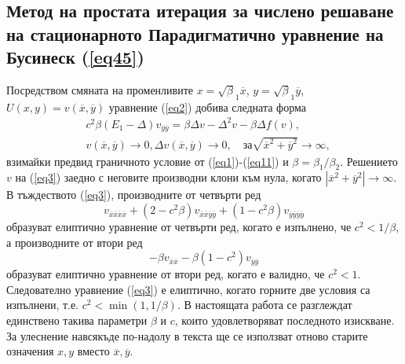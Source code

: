 \documentclass[a4paper]{article}
\newcommand{\be}{\begin{equation}}
\newcommand{\ee}{\end{equation}}
\newcommand{\rf}[1]{(\ref{#1})}
\theoremstyle{remark}
\begin{document}
\begin{large}
\subsection{Метод на простата итерация за числено решаване на стационарното Парадигматично уравнение на Бусинеск \rf{eq45}}\label{simpleIteration}
Посредством смяната на променливите $x=\sqrt\beta_1 { \overline x}$, $y=\sqrt\beta_1 { \overline y}$, $U(x,y)= v({ \overline x},{ \overline y} )$ уравнение 
\rf{eq2} добива следната форма
 \begin{align}\label{eq3}
&c^2 \beta (E_1- \Delta) v_{{\overline y}{\overline y}} = \beta \Delta v - \Delta^2 v - \beta \Delta f(v), \\ 
&v(\overline x, \overline y) \rightarrow 0,  \Delta v(\overline x, \overline y) \rightarrow 0 ,  \quad \text{за}  \sqrt{\overline x^2 + \overline y^2} \rightarrow \infty, \nonumber
\end{align}
взимайки предвид граничното условие от \rf{eq1}-\rf{eq11} и $\beta = \beta_1 / \beta_2$. Решението $v$ на \rf{eq3} заедно с неговите производни клони към нула, когато $|{\overline x}^2 +{\overline y}^2|\rightarrow \infty$. В тъждеството \rf{eq3}, производните от четвърти ред
\be
v_{{\overline x}{\overline x}{\overline x}{\overline x}} + (2-c^2\beta)v_{{\overline x}{\overline x}{\overline y}{\overline y}} + (1-c^2\beta) v_{{\overline y}{\overline y}{\overline y}{\overline y}}
\ee
образуват елиптично уравнение от четвърти ред, когато е изпълнено, че $c^2 < 1/\beta$, а производните от втори ред 
\be
-\beta v_{{\overline x}{\overline x}} - \beta (1-c^2)v_{{\overline y}{\overline y}} 
\ee
образуват елиптично уравнение от втори ред, когато е валидно, че $c^2 < 1$. Следователно уравнение \rf{eq3} е елиптично, когато горните две условия са изпълнени, т.е. $c^2 < \min(1, 1/\beta)$. В настоящата работа се разглеждат единствено такива параметри $\beta$ и $c$, които удовлетворяват последното изискване. За улеснение навсякъде по-надолу в текста ще се използват отново старите означения $x,y$ вместо ${\overline x},{\overline y}$.


\end{large}
\end{document}
